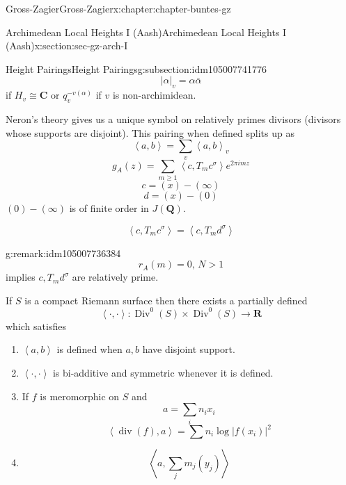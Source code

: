 \documentclass[oneside,10pt,]{book}
\numberwithin{equation}{section}
\newcommand{\pair}[2]{\left\langle #1, #2 \right\rangle}
\newcommand{\QQ}{\mathbf{Q}}
\newcommand{\RR}{\mathbf{R}}
\newcommand{\CC}{\mathbf{C}}
\DeclareMathOperator{\divisor}{div}
\DeclareMathOperator{\Div}{Div}
\newcommand{\gt}{>}
\begin{document}
\begin{chapterptx}{Gross-Zagier}{}{Gross-Zagier}{}{}{x:chapter:chapter-buntes-gz}
\begin{sectionptx}{Archimedean Local Heights I (Aash)}{}{Archimedean Local Heights I (Aash)}{}{}{x:section:sec-gz-arch-I}
\begin{subsectionptx}{Height Pairings}{}{Height Pairings}{}{}{g:subsection:idm105007741776}
\begin{equation*}
|\alpha |_v = \alpha \bar \alpha
\end{equation*}
if \(H_v \cong \CC\) or \(q_v^{-v(\alpha )}\) if \(v\) is non-archimidean.%
\par
Neron's theory gives us a unique symbol on relatively primes divisors (divisors whose supports are disjoint). This pairing when defined splits up as%
\begin{equation*}
\pair ab = \sum_v \pair ab_v
\end{equation*}
%
\begin{equation*}
g_A(z) = \sum_{m\ge1} \pair c{ T_m c^\sigma } e^{2\pi  i m z}
\end{equation*}
%
\begin{equation*}
c=(x) - (\infty )
\end{equation*}
%
\begin{equation*}
d = (x) - (0)
\end{equation*}
\((0)-(\infty )\) is of finite order in \(J(\QQ)\).%
\par
%
\begin{equation*}
\pair c{T_m c^\sigma } = \pair c {T_m d^\sigma }
\end{equation*}
%
\begin{remark}{}{g:remark:idm105007736384}%
%
\begin{equation*}
r_A(m) = 0,\, N \gt1
\end{equation*}
implies \(c,T_m d^\sigma\)  are relatively prime.%
\end{remark}
If \(S\) is a compact Riemann surface then there exists a partially defined%
\begin{equation*}
\pair \cdot \cdot \colon  \Div^0(S) \times \Div^0(S) \to \RR
\end{equation*}
which satisfies%
\begin{enumerate}
\item{}\(\pair ab\) is defined when \(a,b\) have disjoint support.%
\item{}\(\pair \cdot\cdot\) is bi-additive and symmetric whenever it is defined.%
\item{}If \(f\) is meromorphic on \(S\) and%
\begin{equation*}
a= \sum_i n_i x_i
\end{equation*}
%
\begin{equation*}
\pair{\divisor (f)} a = \sum n_i \log|f(x_i)|^2
\end{equation*}
%
\item{}%
\begin{equation*}
\pair a {\sum_j m_j (y_j)}

\end{equation*}
\end{enumerate}
\end{subsectionptx}
\end{sectionptx}
\end{chapterptx}
\end{document}
